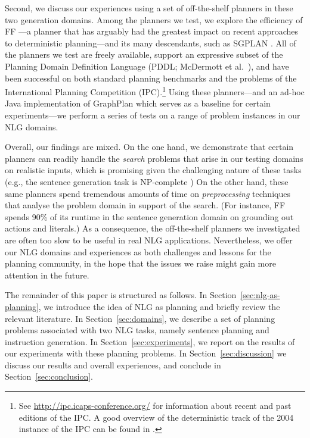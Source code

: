 Second, we discuss our experiences using a set of off-the-shelf planners in
these two generation domains. Among the planners we test, we explore the
efficiency of FF \citep{HoffmannNebel01}---a planner that has arguably had the
greatest impact on recent approaches to deterministic planning---and its many
descendants, such as SGPLAN \citep{hsu06:_new_featur_in_sgplan_for}. All of the
planners we test are freely available, support an expressive subset of the
Planning Domain Definition Language (PDDL; McDermott et al.~\citeyear{PDDL}),
and have been successful on both standard planning benchmarks and the problems
of the International Planning Competition (IPC).\footnote{See
  \url{http://ipc.icaps-conference.org/} for information about recent and past
  editions of the IPC. A good overview of the deterministic track of the 2004
  instance of the IPC can be found in \citep{Hoffmann-Edelkamp:05}.}
Using these planners---and an ad-hoc Java implementation of GraphPlan
\citep{Blum1997} which serves as a baseline for certain experiments---we perform
a series of tests on a range of problem instances in our NLG domains.

Overall, our findings are mixed. On the one hand, we demonstrate that certain
planners can readily handle the \emph{search} problems that arise in our testing
domains on realistic inputs, which is promising given the challenging nature of
these tasks (e.g., the sentence generation task is NP-complete \citep{KolStr02})
On the other hand, these same planners spend tremendous amounts of time on
\emph{preprocessing} techniques that analyse the problem domain in support of
the search. (For instance, FF spends 90\% of its runtime in the sentence
generation domain on grounding out actions and literals.) As a consequence, the
off-the-shelf planners we investigated are often too slow to be useful in real
NLG applications.  Nevertheless, we offer our NLG domains and experiences as
both challenges and lessons for the planning community, in the hope that the
issues we raise might gain more attention in the future.

The remainder of this paper is structured as follows. In
Section~\ref{sec:nlg-as-planning}, we introduce the idea of NLG as planning and
briefly review the relevant literature. In Section~\ref{sec:domains}, we
describe a set of planning problems associated with two NLG tasks, namely
sentence planning and instruction generation. In Section~\ref{sec:experiments},
we report on the results of our experiments with these planning problems.
In Section~\ref{sec:discussion} we discuss our results and overall
experiences, and conclude in Section~\ref{sec:conclusion}.


